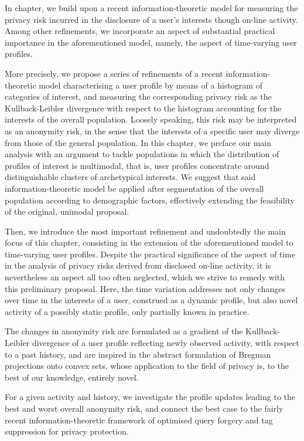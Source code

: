 In chapter, we build upon a recent information-theoretic model for measuring the privacy risk incurred in the disclosure of a user’s interests though on-line activity. Among other refinements, we incorporate an aspect of substantial practical importance in the aforementioned model, namely, the aspect of time-varying user profiles.

More precisely, we propose a series of refinements of a recent information-theoretic model characterising a user profile by means of a histogram of categories of interest, and measuring the corresponding privacy risk as the Kullback-Leibler divergence with respect to the histogram accounting for the interests of the overall population. Loosely speaking, this risk may be interpreted as an anonymity risk, in the sense that the interests of a specific user may diverge from those of the general population. 
In this chapter, we preface our main analysis with an argument to tackle populations in which the distribution of profiles of interest is multimodal, that is, user profiles concentrate around distinguishable clusters of archetypical interests. We suggest that said information-theoretic model be applied after segmentation of the overall population according to demographic factors, effectively extending the feasibility of the original, unimodal proposal.

Then, we introduce the most important refinement and undoubtedly the main focus of this chapter, consisting in the extension of the aforementioned model to time-varying user profiles. Despite the practical significance of the aspect of time in the analysis of privacy risks derived from disclosed on-line activity, it is nevertheless an aspect all too often neglected, which we strive to remedy with this preliminary proposal. Here, the time variation addresses not only changes over time in the interests of a user, construed as a dynamic profile, but also novel activity of a possibly static profile, only partially known in practice.

The changes in anonymity risk are formulated as a gradient of the Kullback-Leibler divergence of a user profile reflecting newly observed activity, with respect to a past history, and are inspired in the abstract formulation of Bregman projections onto convex sets, whose application to the field of privacy is, to the best of our knowledge, entirely novel.

For a given activity and history, we investigate the profile updates leading to the best and worst overall anonymity risk, and connect the best case to the fairly recent information-theoretic framework of optimised query forgery and tag suppression for privacy protection.

